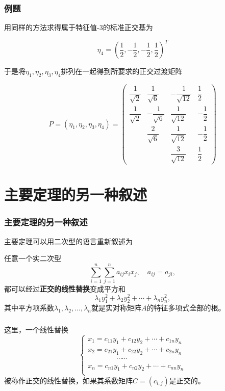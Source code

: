 \begin{frame}
\frametitle{例题}

用同样的方法求得属于特征值-3的标准正交基为

\[\eta_4 = \left( \dfrac{1}{2}, -\dfrac{1}{2}, -\dfrac{1}{2}, \dfrac{1}{2} \right)^T\]

于是将$\eta_1, \eta_2, \eta_3, \eta_4$排列在一起得到所要求的正交过渡矩阵

\[P = (\eta_1, \eta_2, \eta_3, \eta_4) = \begin{pmatrix} \dfrac{1}{\sqrt{2}} & \dfrac{1}{\sqrt{6}} & -\dfrac{1}{\sqrt{12}} & \dfrac{1}{2} \\ \dfrac{1}{\sqrt{2}} & -\dfrac{1}{\sqrt{6}} & \dfrac{1}{\sqrt{12}} & -\dfrac{1}{2} \\ & \dfrac{2}{\sqrt{6}} & \dfrac{1}{\sqrt{12}} & -\dfrac{1}{2} \\ & & \dfrac{3}{\sqrt{12}} & \dfrac{1}{2} \end{pmatrix}\]

\end{frame}


\section{主要定理的另一种叙述}


\begin{frame}
\frametitle{主要定理的另一种叙述}

主要定理可以用二次型的语言重新叙述为

\begin{thm}
任意一个实二次型
\[\sum\limits_{i=1}^n \sum\limits_{j=1}^n a_{ij}x_ix_j, \quad a_{ij} = a_{ji},\]
都可以经过{\bfseries 正交的线性替换}变成平方和
\[\lambda_1 y_1^2 + \lambda_2 y_2^2 + \cdots + \lambda_n y_n^2,\]
其中平方项系数$\lambda_1,\lambda_2,\ldots,\lambda_n$就是实对称矩阵$A$的特征多项式全部的根。
\end{thm}

\end{frame}


\begin{frame}
\frametitle{}

这里，一个线性替换
\[
\begin{cases}
x_1 = c_{11}y_1 + c_{12}y_2 + \cdots + c_{1n}y_n \\
x_2 = c_{21}y_1 + c_{22}y_2 + \cdots + c_{2n}y_n \\
\hspace{4em} \cdots\cdots \\
x_n = c_{n1}y_1 + c_{n2}y_2 + \cdots + c_{nn}y_n \\
\end{cases}
\]
被称作正交的线性替换，如果其系数矩阵$C = (c_{i,j})$是正交的。

\end{frame}

